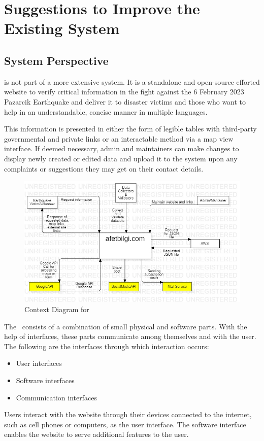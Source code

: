 \section{Suggestions to Improve the Existing System}

\subsection{System Perspective}

\afetbilgi is not part of a more extensive system. It is a standalone and open-source efforted website to verify critical information in the fight against the 6 February 2023 Pazarcik Earthquake and deliver it to disaster victims and those who want to help in an understandable, concise manner in multiple languages.

This information is presented in either the form of legible tables with third-party governmental and private links or an interactable method via a map view interface. If deemed necessary, admin and maintainers can make changes to display newly created or edited data and upload it to the system upon any complaints or suggestions they may get on their contact details.

\begin{figure}[H]
  \centering
  \includegraphics[width=\linewidth]{img/context-diagram-s4.jpg}
  \caption{Context Diagram for \afetbilgi}
\end{figure}

\vfill
\newpage

The \afetbilgi\ consists of a combination of small physical and software parts. With the help of interfaces, these parts communicate among themselves and with the user. The following are the interfaces through which interaction occurs:
\begin{itemize}
  \setlength{\itemsep}{1pt}
  \item User interfaces
  \item Software interfaces
  \item Communication interfaces
\end{itemize}
Users interact with the website through their devices connected to the internet, such as cell phones or computers, as the user interface. The software interface enables the website to serve additional features to the user.

